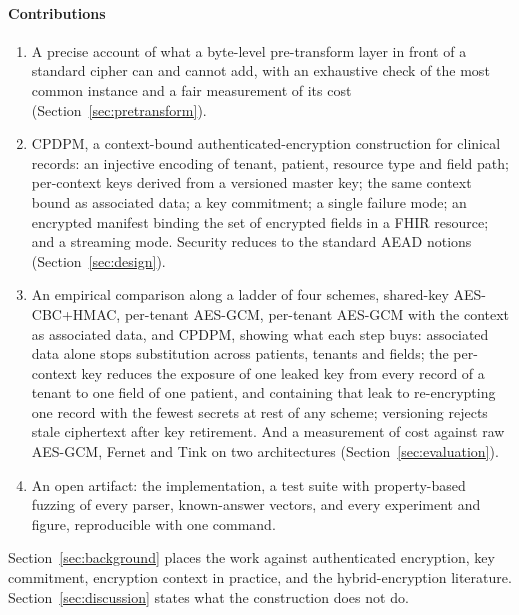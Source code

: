 \paragraph{Contributions}
\begin{enumerate}
  \item A precise account of what a byte-level pre-transform layer in front of a standard cipher can and cannot add, with an exhaustive check of the most common instance and a fair measurement of its cost (Section~\ref{sec:pretransform}).
  \item CPDPM, a context-bound authenticated-encryption construction for clinical records: an injective encoding of tenant, patient, resource type and field path; per-context keys derived from a versioned master key; the same context bound as associated data; a key commitment; a single failure mode; an encrypted manifest binding the set of encrypted fields in a FHIR resource; and a streaming mode. Security reduces to the standard AEAD notions (Section~\ref{sec:design}).
  \item An empirical comparison along a ladder of four schemes, shared-key AES-CBC+HMAC, per-tenant AES-GCM, per-tenant AES-GCM with the context as associated data, and CPDPM, showing what each step buys: associated data alone stops substitution across patients, tenants and fields; the per-context key reduces the exposure of one leaked key from every record of a tenant to one field of one patient, and containing that leak to re-encrypting one record with the fewest secrets at rest of any scheme; versioning rejects stale ciphertext after key retirement. And a measurement of cost against raw AES-GCM, Fernet and Tink on two architectures (Section~\ref{sec:evaluation}).
  \item An open artifact: the implementation, a test suite with property-based fuzzing of every parser, known-answer vectors, and every experiment and figure, reproducible with one command.
\end{enumerate}

Section~\ref{sec:background} places the work against authenticated encryption, key commitment, encryption context in practice, and the hybrid-encryption literature. Section~\ref{sec:discussion} states what the construction does not do.
